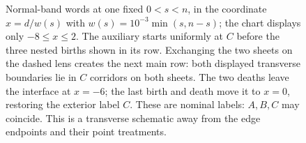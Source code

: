 \begin{figure}[tbp]
\endgroup
\caption{Normal-band words at one fixed $0<s<n$, in the coordinate
  $x=d/w(s)$ with $w(s)=10^{-3}\min(s,n-s)$; the chart displays only
  $-8\le x\le2$. The auxiliary starts uniformly at $C$ before the three
  nested births shown in its row. Exchanging the two sheets on the dashed
  lens creates the next main row: both displayed transverse boundaries
  lie in $C$ corridors on both sheets. The two deaths leave the interface
  at $x=-6$; the last
  birth and death move it to $x=0$, restoring the exterior label $C$.
  These are nominal labels: $A,B,C$ may coincide. This is a transverse
  schematic away from the edge endpoints and their point treatments.}
\label{fig:geometry-bands}
\end{figure}
